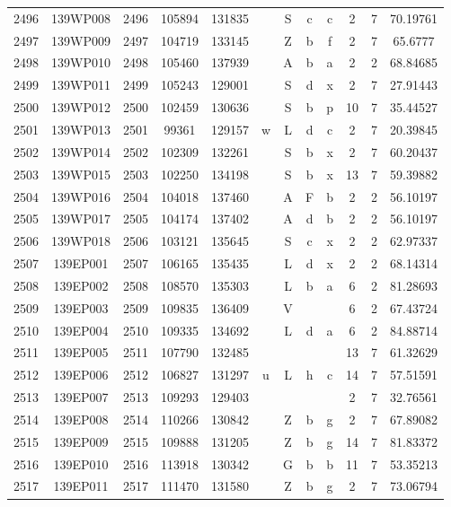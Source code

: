\begin{tabular}{|*{12}{c|}}
2496 & 139WP008 & 2496 & 105894 & 131835 &  & S & c & c & 2 & 7 & 70.19761 \\ 
2497 & 139WP009 & 2497 & 104719 & 133145 &  & Z & b & f & 2 & 7 & 65.6777 \\ 
2498 & 139WP010 & 2498 & 105460 & 137939 &  & A & b & a & 2 & 2 & 68.84685 \\ 
2499 & 139WP011 & 2499 & 105243 & 129001 &  & S & d & x & 2 & 7 & 27.91443 \\ 
2500 & 139WP012 & 2500 & 102459 & 130636 &  & S & b & p & 10 & 7 & 35.44527 \\ 
2501 & 139WP013 & 2501 & 99361 & 129157 & w & L & d & c & 2 & 7 & 20.39845 \\ 
2502 & 139WP014 & 2502 & 102309 & 132261 &  & S & b & x & 2 & 7 & 60.20437 \\ 
2503 & 139WP015 & 2503 & 102250 & 134198 &  & S & b & x & 13 & 7 & 59.39882 \\ 
2504 & 139WP016 & 2504 & 104018 & 137460 &  & A & F & b & 2 & 2 & 56.10197 \\ 
2505 & 139WP017 & 2505 & 104174 & 137402 &  & A & d & b & 2 & 2 & 56.10197 \\ 
2506 & 139WP018 & 2506 & 103121 & 135645 &  & S & c & x & 2 & 2 & 62.97337 \\ 
2507 & 139EP001 & 2507 & 106165 & 135435 &  & L & d & x & 2 & 2 & 68.14314 \\ 
2508 & 139EP002 & 2508 & 108570 & 135303 &  & L & b & a & 6 & 2 & 81.28693 \\ 
2509 & 139EP003 & 2509 & 109835 & 136409 &  & V &  &  & 6 & 2 & 67.43724 \\ 
2510 & 139EP004 & 2510 & 109335 & 134692 &  & L & d & a & 6 & 2 & 84.88714 \\ 
2511 & 139EP005 & 2511 & 107790 & 132485 &  &  &  &  & 13 & 7 & 61.32629 \\ 
2512 & 139EP006 & 2512 & 106827 & 131297 & u & L & h & c & 14 & 7 & 57.51591 \\ 
2513 & 139EP007 & 2513 & 109293 & 129403 &  &  &  &  & 2 & 7 & 32.76561 \\ 
2514 & 139EP008 & 2514 & 110266 & 130842 &  & Z & b & g & 2 & 7 & 67.89082 \\ 
2515 & 139EP009 & 2515 & 109888 & 131205 &  & Z & b & g & 14 & 7 & 81.83372 \\ 
2516 & 139EP010 & 2516 & 113918 & 130342 &  & G & b & b & 11 & 7 & 53.35213 \\ 
2517 & 139EP011 & 2517 & 111470 & 131580 &  & Z & b & g & 2 & 7 & 73.06794 \\ 

\end{tabular}
